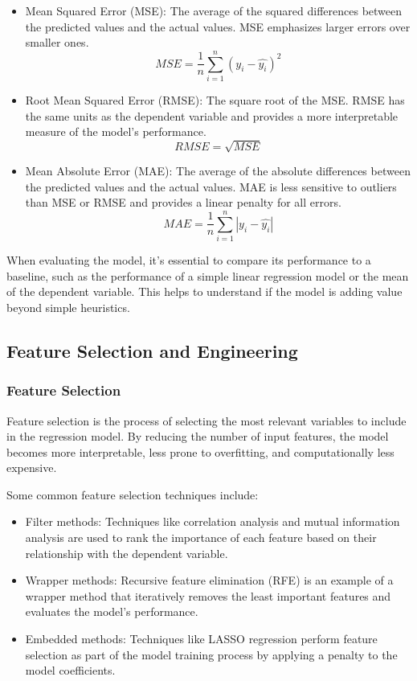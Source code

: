 \documentclass{beamer}
\begin{document}
\begin{itemize}
\item Mean Squared Error (MSE): The average of the squared differences between the predicted values and the actual values. MSE emphasizes larger errors over smaller ones.
\begin{equation}
MSE = \frac{1}{n}\sum_{i=1}^{n}(y_i - \hat{y_i})^2
\end{equation}

\item Root Mean Squared Error (RMSE): The square root of the MSE. RMSE has the same units as the dependent variable and provides a more interpretable measure of the model's performance.
\begin{equation}
RMSE = \sqrt{MSE}
\end{equation}

\item Mean Absolute Error (MAE): The average of the absolute differences between the predicted values and the actual values. MAE is less sensitive to outliers than MSE or RMSE and provides a linear penalty for all errors.
\begin{equation}
MAE = \frac{1}{n}\sum_{i=1}^{n}|y_i - \hat{y_i}|
\end{equation}
\end{itemize}

When evaluating the model, it's essential to compare its performance to a baseline, such as the performance of a simple linear regression model or the mean of the dependent variable. This helps to understand if the model is adding value beyond simple heuristics.

\subsection{Feature Selection and Engineering}

\subsubsection{Feature Selection}
Feature selection is the process of selecting the most relevant variables to include in the regression model. By reducing the number of input features, the model becomes more interpretable, less prone to overfitting, and computationally less expensive.

Some common feature selection techniques include:

\begin{itemize}
\item Filter methods: Techniques like correlation analysis and mutual information analysis are used to rank the importance of each feature based on their relationship with the dependent variable.
\item Wrapper methods: Recursive feature elimination (RFE) is an example of a wrapper method that iteratively removes the least important features and evaluates the model's performance.
\item Embedded methods: Techniques like LASSO regression perform feature selection as part of the model training process by applying a penalty to the model coefficients.
\end{itemize}
\end{document}
